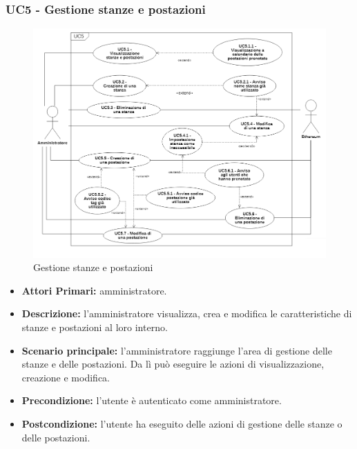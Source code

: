 \subsubsection{ UC5 - Gestione stanze e postazioni}
\begin{figure}[H]
	\centering
	\includegraphics[width=18cm]{res/images/UC5.png}
	\caption{Gestione stanze e postazioni}
	\label{fig:Gestione stanze e postazioni}
\end{figure}
\begin{itemize}
           	\item\textbf{Attori Primari:} 
           	amministratore.
           	\item\textbf{Descrizione:} 
           	l'amministratore visualizza, crea e modifica le caratteristiche di stanze e postazioni al loro interno.
           	\item\textbf{Scenario principale:} 
           	l'amministratore raggiunge l'area di gestione delle stanze e delle postazioni. Da lì può eseguire le azioni di visualizzazione, creazione e modifica.
           	\item\textbf{Precondizione:} 
           	l'utente è autenticato come amministratore.
           	\item\textbf{Postcondizione:}
           	l'utente ha eseguito delle azioni di gestione delle stanze o delle postazioni.
\end{itemize}

